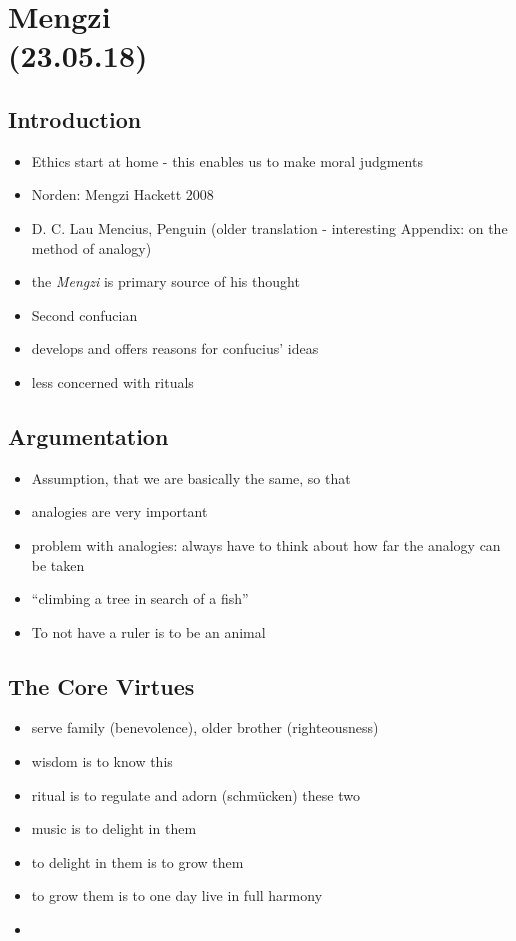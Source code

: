 \documentclass[emulatestandardclasses]{scrartcl}
\begin{document}
\section{Mengzi\\(23.05.18)}

\subsection{Introduction}

\begin{itemize}
  \item Ethics start at home - this enables us to make moral judgments
  \item Norden: Mengzi Hackett 2008
  \item D. C. Lau Mencius, Penguin (older translation - interesting Appendix: on the method of analogy)
  \item the \emph{Mengzi} is primary source of his thought
  \item Second confucian
  \item develops and offers reasons for confucius' ideas
  \item less concerned with rituals
\end{itemize}

\subsection{Argumentation}

\begin{itemize}
  \item Assumption, that we are basically the same, so that 
  \item analogies are very important
  \item problem with analogies: always have to think about how far the analogy can be taken
  \item "`climbing a tree in search of a fish"'
  \item To not have a ruler is to be an animal
\end{itemize}


\subsection{The Core Virtues}

\begin{itemize}
  \item serve family (benevolence), older brother (righteousness)
  \item wisdom is to know this
  \item ritual is to regulate and adorn (schmücken) these two
  \item music is to delight in them
  \item to delight in them is to grow them
  \item to grow them is to one day live in full harmony
  \item 
\end{itemize}
\end{document}
